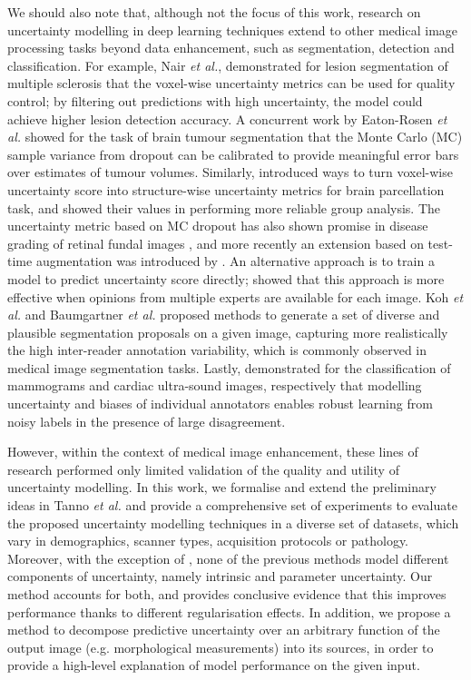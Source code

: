 We should also note that, although not the focus of this work, research on uncertainty modelling in deep learning techniques extend to other medical image processing tasks beyond data enhancement, such as segmentation, detection and classification. For example, Nair \emph{et al.}, \cite{nair2018exploring} demonstrated for lesion segmentation of multiple sclerosis that the voxel-wise uncertainty metrics can be used for quality control; by filtering out predictions with high uncertainty, the model could achieve higher lesion detection accuracy. A concurrent work by Eaton-Rosen \emph{et al.} \cite{eaton2018towards} showed for the task of brain tumour segmentation that the Monte Carlo (MC) sample variance from dropout \cite{gal2015dropout} can be calibrated to provide meaningful error bars over estimates of tumour volumes. Similarly,  \cite{roy2019bayesian} introduced ways to turn voxel-wise uncertainty score into structure-wise uncertainty metrics for brain parcellation task, and showed their values in performing more reliable group analysis. The uncertainty metric based on MC dropout has also shown promise in disease grading of retinal fundal images \cite{worrall2016automated,leibig2017leveraging}, and more recently an extension based on test-time augmentation was introduced by \cite{ayhan2018test}. An alternative approach is to train a model to predict uncertainty score directly; \cite{Raghu2018DirectUP} showed that this approach is more effective when opinions from multiple experts are available for each image. Koh \emph{et al.} \cite{kohl2018probabilistic} and Baumgartner \emph{et al.} \cite{PHiSeg2019Baumgartner} proposed methods to generate a set of diverse and plausible segmentation proposals on a given image, capturing more realistically the high inter-reader annotation variability, which is commonly observed in medical image segmentation tasks. Lastly, \cite{raykar2010learning,tanno2019learning} demonstrated for the classification of mammograms and cardiac ultra-sound images, respectively that modelling uncertainty and biases of individual annotators enables robust learning from noisy labels in the presence of large disagreement. 

However, within the context of medical image enhancement, these lines of research performed only limited validation of the quality and utility of uncertainty modelling. In this work, we formalise and extend the preliminary ideas in Tanno \emph{et al.} \cite{tanno2017bayesian} and provide a comprehensive set of experiments to evaluate the proposed uncertainty modelling techniques in a diverse set of datasets, which vary in demographics, scanner types, acquisition protocols or pathology. Moreover, with the exception of \cite{tanno2017bayesian}, none of the previous methods model different components of uncertainty, namely intrinsic and parameter uncertainty. Our method accounts for both, and provides conclusive evidence that this improves performance thanks to different regularisation effects. In addition, we propose a method to decompose predictive uncertainty over an arbitrary function of the output image (e.g. morphological measurements) into its sources, in order to provide a high-level explanation of model performance on the given input. 


